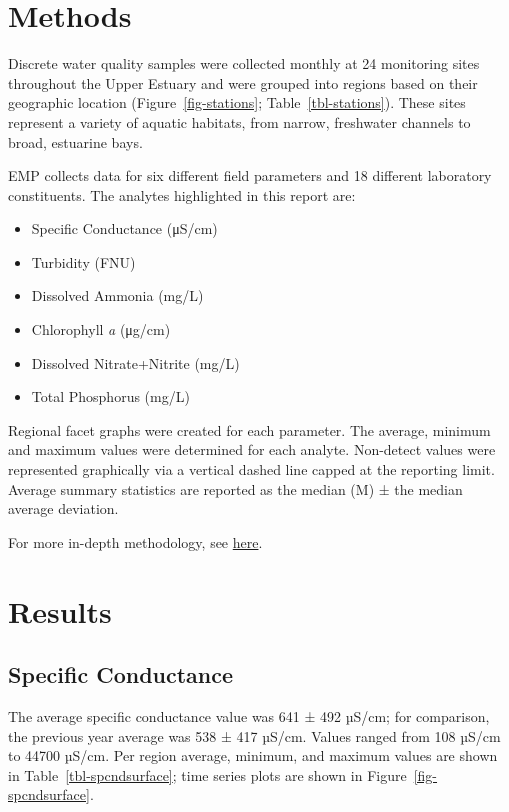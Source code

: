 \documentclass[
  letterpaper,
]{article}
\providecommand{\tightlist}{%
  \setlength{\itemsep}{0pt}\setlength{\parskip}{0pt}}
\begin{document}
\section{Methods}\label{methods}

Discrete water quality samples were collected monthly at 24 monitoring
sites throughout the Upper Estuary and were grouped into regions based
on their geographic location (Figure~\ref{fig-stations};
Table~\ref{tbl-stations}). These sites represent a variety of aquatic
habitats, from narrow, freshwater channels to broad, estuarine bays.

EMP collects data for six different field parameters and 18 different
laboratory constituents. The analytes highlighted in this report are:

\begin{itemize}
\tightlist
\item
  Specific Conductance (μS/cm)
\item
  Turbidity (FNU)
\item
  Dissolved Ammonia (mg/L)
\item
  Chlorophyll \emph{a} (μg/cm)
\item
  Dissolved Nitrate+Nitrite (mg/L)
\item
  Total Phosphorus (mg/L)
\end{itemize}

Regional facet graphs were created for each parameter. The average,
minimum and maximum values were determined for each analyte. Non-detect
values were represented graphically via a vertical dashed line capped at
the reporting limit. Average summary statistics are reported as the
median (M) ± the median average deviation.

For more in-depth methodology, see
\href{https://portal.edirepository.org/nis/metadataviewer?packageid=edi.1320.6}{here}.

\section{Results}\label{results}

\subsection{Specific Conductance}\label{specific-conductance}

The average specific conductance value was 641 ± 492 µS/cm; for
comparison, the previous year average was 538 ± 417 µS/cm. Values ranged
from 108 µS/cm to 44700 µS/cm. Per region average, minimum, and maximum
values are shown in Table~\ref{tbl-spcndsurface}; time series plots are
shown in Figure~\ref{fig-spcndsurface}.
\end{document}
